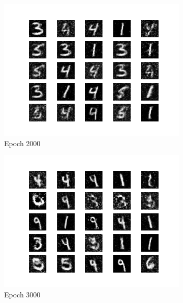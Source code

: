 \documentclass[conference]{IEEEtran}
\begin{document}
\begin{figure}[htbp]
    \centering
     \begin{subfigure}[b]{\columnwidth}
         \centering
         \includegraphics[width=\textwidth,keepaspectratio]{GAN_2000.png}
         \caption{Epoch 2000}
         \label{fig:gan2000}
     \end{subfigure}
     \begin{subfigure}[b]{\columnwidth}
         \centering
         \includegraphics[width=\textwidth,keepaspectratio]{GAN_3000.png}
         \caption{Epoch 3000}
         \label{fig:gan3000}
     \end{subfigure}
     \begin{subfigure}[b]{\columnwidth}

\end{subfigure}
\end{figure}
\end{document}
